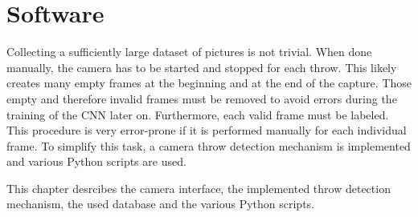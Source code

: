 \section{Software}
\label{sec:software}

Collecting a sufficiently large dataset of pictures is not trivial.
When done manually, the camera has to be started and stopped for each throw.
This likely creates many empty frames at the beginning and at the end of the capture.
Those empty and therefore invalid frames must be removed to avoid errors during the training of the CNN later on.
Furthermore, each valid frame must be labeled.
This procedure is very error-prone if it is performed manually for each individual frame.
To simplify this task, a camera throw detection mechanism is implemented and various Python scripts are used.

This chapter desrcibes the camera interface, the implemented throw detection mechanism, the used database and the various Python scripts.





